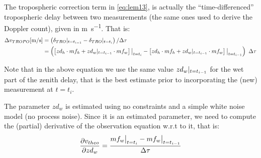 The tropospheric correction term in \ref{eq:lem13}, is actually the ``time-differenced'' 
tropospheric delay between two measurements (the same ones used to derive the 
Doppler count), given in \si{\m \per \s}. That is:
\begin{equation}
  \begin{aligned}
    \Delta v_{TROPO} [\si{\m \per \s}] 
      &= \left( \delta _{TRO} \at{t=t_{i-1}} - \delta _{TRO} \at{t=t_{i}} \right) / \Delta \tau\\
      &= \left( \left[ zd_{h} \cdot mf_{h} + zd_{w}\at{t=t_{i-1}} \cdot mf_{w} \right]\at[\big]{t=t_i} - 
        \left[ zd_{h} \cdot mf_{h} + zd_{w}\at{t=t_{i-1}} \cdot mf_{w} \right]\at[\big]{t=t_{i-1}} \right) \ \Delta \tau
    \label{eq:dtrop-diff}
  \end{aligned}
\end{equation}

Note that in the above equation we use the same value $zd_{w}|_{t=t_{i-1}}$ 
for the wet part of the zenith delay, that is the best estimate prior to 
incorporating the (new) measurement at $t=t_i$.

The parameter $zd_{w}$ is estimated using no constraints and a simple white 
noise model (no process noise). Since it is an estimated parameter, we need 
to compute the (partial) derivative of the observation equation w.r.t to it, 
that is:
\begin{equation}
  \frac{\partial v_{theo}}{\partial zd_{w}} = \frac{mf_{w}\at[\big]{t=t_i} 
    - mf_{w}\at[\big]{t=t_{i-1}}}{\Delta \tau}
  \label{eq:partials-zwd}
\end{equation}
\fi
